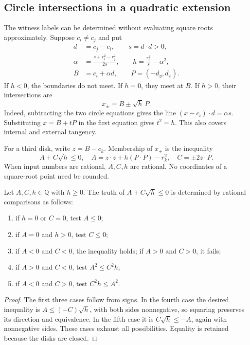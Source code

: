 \subsection{Circle intersections in a quadratic extension}
The witness labels can be determined without evaluating square roots approximately. Suppose $c_i\ne c_j$ and put
\begin{align}
d&=c_j-c_i,\qquad s=d\cdot d>0,\nonumber\\
\alpha&=\frac{s+r_i^2-r_j^2}{2s},\qquad
h=\frac{r_i^2}{s}-\alpha^2,\label{eq:circle-parameters}\\
B&=c_i+\alpha d,\qquad P=(-d_y,d_x).\nonumber
\end{align}
If $h<0$, the boundaries do not meet. If $h=0$, they meet at $B$. If $h>0$, their intersections are
\begin{equation}\label{eq:circle-points}
x_{\pm}=B\pm\sqrt h\,P.
\end{equation}
Indeed, subtracting the two circle equations gives the line $(x-c_i)\cdot d=\alpha s$. Substituting $x=B+tP$ in the first equation gives $t^2=h$. This also covers internal and external tangency.

For a third disk, write $z=B-c_k$. Membership of $x_\pm$ is the inequality
\begin{equation}\label{eq:quadratic-membership}
A+C\sqrt h\le0,
\quad A=z\cdot z+h(P\cdot P)-r_k^2,
\quad C=\pm2z\cdot P.
\end{equation}
When input numbers are rational, $A,C,h$ are rational. No coordinates of a square-root point need be rounded.

\begin{lemma}\label{lem:sign}
Let $A,C,h\in\mathbb Q$ with $h\ge0$. The truth of $A+C\sqrt h\le0$ is determined by rational comparisons as follows:
\begin{enumerate}
\item if $h=0$ or $C=0$, test $A\le0$;
\item if $A=0$ and $h>0$, test $C\le0$;
\item if $A<0$ and $C<0$, the inequality holds; if $A>0$ and $C>0$, it fails;
\item if $A>0$ and $C<0$, test $A^2\le C^2h$;
\item if $A<0$ and $C>0$, test $C^2h\le A^2$.
\end{enumerate}
\end{lemma}
\begin{proof}
The first three cases follow from signs. In the fourth case the desired inequality is $A\le(-C)\sqrt h$, with both sides nonnegative, so squaring preserves its direction and equivalence. In the fifth case it is $C\sqrt h\le -A$, again with nonnegative sides. These cases exhaust all possibilities. Equality is retained because the disks are closed.
\end{proof}

